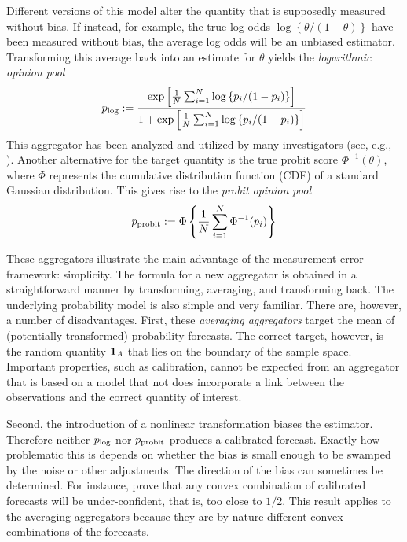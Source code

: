 \documentclass[11pt]{article}
\theoremstyle{definition}
\theoremstyle{definition}
\def\one{{\bf 1}}
\def\probit{p_{\rm probit}}
\def\plog{p_{\rm log}}
\begin{document}
Different versions of this model alter the quantity that is supposedly
measured without bias. If instead, for example, the true log odds
$\log\left\{\theta/(1-\theta)\right\}$ have been measured without
bias, the average log odds will be an unbiased estimator. Transforming
this average back into an estimate for $\theta$ yields the {\em
logarithmic opinion pool}
$$\plog := \frac{\exp \left [ \frac{1}{N} \sum_{i=1}^N
   \log \left\{ p_i / (1-p_i) \right\} \right ]} {1 + \exp \left [
\frac{1}{N} \sum_{i=1}^N \log \left\{p_i / (1-p_i)\right\} \right
]} $$ This aggregator has been analyzed and utilized by many
investigators (see, e.g., \citealt{dawid1995coherent, Genest,
bacharach1975group}). Another alternative for the target quantity is
the true probit score $\Phi^{-1}(\theta)$, where $\Phi$ represents the
cumulative distribution function (CDF) of a standard Gaussian
distribution. This gives rise to the {\em probit opinion pool}
$$\probit := \Phi \left\{ \frac{1}{N} \sum_{i=1}^N \Phi^{-1}
   (p_i) \right \} $$

These aggregators illustrate the main advantage of the measurement
error framework: simplicity.  The formula for a new aggregator is
obtained in a straightforward manner by transforming, averaging, and
transforming back.  The underlying probability model is also simple
and very familiar.  There are, however, a number of disadvantages.
First, these \textit{averaging aggregators} target the mean of
(potentially transformed) probability forecasts. The correct target,
however, is the random quantity $\one_A$ that lies on the boundary of
the sample space. Important properties, such as calibration, cannot be
expected from an aggregator that is based on a model that not does
incorporate a link between the observations and the correct quantity
of interest.

Second, the introduction of a nonlinear transformation biases the
estimator.  Therefore neither $\plog$ nor $\probit$ produces a
calibrated forecast. Exactly how problematic this is depends on
whether the bias is small enough to be swamped by the noise or other
adjustments.  The direction of the bias can sometimes be
determined. For instance, \citet{Ranjan08} prove that any convex
combination of calibrated forecasts will be under-confident, that is,
too close to $1/2$. This result applies to the averaging aggregators
because they are by nature different convex combinations of the
forecasts.
\end{document}
